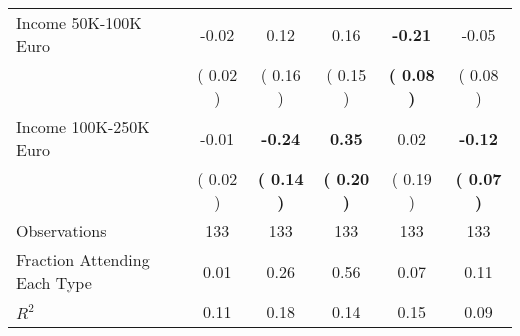 \begin{table}[H]
{\begin{tabular}{lccccc}
\quad Income 50K-100K Euro &     -0.02 &      0.12 &      0.16 & \textbf{    -0.21} &     -0.05 \\
\quad  & (     0.02 ) & (     0.16 )  & (     0.15 )  & \textbf{(     0.08 )} & (     0.08 ) \\
\quad Income 100K-250K Euro &     -0.01 & \textbf{    -0.24} & \textbf{     0.35} &      0.02 & \textbf{    -0.12} \\
\quad  & (     0.02 ) & \textbf{(     0.14 )}  & \textbf{(     0.20 )}  & (     0.19 ) & \textbf{(     0.07 )} \\
\midrule
Observations & 133 & 133 & 133 & 133 & 133 \\
Fraction Attending Each Type &      0.01 &      0.26 &      0.56 &      0.07 &      0.11 \\
\midrule
$ R^2$ &      0.11 &      0.18 &      0.14 &      0.15 &      0.09 \\
\bottomrule
\end{tabular}}
\end{table}

